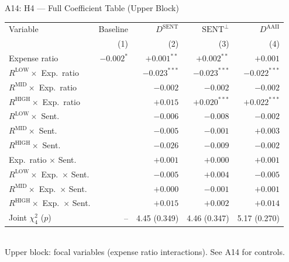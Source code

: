 \documentclass[10pt, aspectratio=169]{beamer}
\begin{document}
\begin{frame}{A14: H4 — Full Coefficient Table (Upper Block)}
  \scriptsize
  \setlength{\tabcolsep}{4pt}
  \begin{tabular}{@{}lrrrr@{}}
    \toprule
    Variable & Baseline & $D^{\text{SENT}}$ & $\text{SENT}^\perp$ & $D^{\text{AAII}}$ \\
    & (1) & (2) & (3) & (4) \\
    \midrule
    Expense ratio                          & $-0.002^{*}$  & $+0.001^{**}$ & $+0.002^{**}$ & $+0.001$ \\
    $R^{\text{LOW}}\times$ Exp.\ ratio     &               & $-0.023^{***}$& $-0.023^{***}$& $-0.022^{***}$ \\
    $R^{\text{MID}}\times$ Exp.\ ratio     &               & $-0.002$      & $-0.002$      & $-0.002$ \\
    $R^{\text{HIGH}}\times$ Exp.\ ratio    &               & $+0.015$      & $+0.020^{***}$& $+0.022^{***}$ \\
    $R^{\text{LOW}}\times$ Sent.           &               & $-0.006$      & $-0.008$      & $-0.002$ \\
    $R^{\text{MID}}\times$ Sent.           &               & $-0.005$      & $-0.001$      & $+0.003$ \\
    $R^{\text{HIGH}}\times$ Sent.          &               & $-0.026$      & $-0.009$      & $-0.002$ \\
    Exp.\ ratio $\times$ Sent.             &               & $+0.001$      & $+0.000$      & $+0.001$ \\
    $R^{\text{LOW}}\times$ Exp.\ $\times$ Sent. &          & $-0.005$      & $+0.004$      & $-0.005$ \\
    $R^{\text{MID}}\times$ Exp.\ $\times$ Sent. &          & $+0.000$      & $-0.001$      & $+0.001$ \\
    $R^{\text{HIGH}}\times$ Exp.\ $\times$ Sent.&          & $+0.015$      & $+0.002$      & $+0.014$ \\
    \midrule
    Joint $\chi^2_4$ ($p$)                 & --            & 4.45 (0.349)  & 4.46 (0.347)  & 5.17 (0.270) \\
    \bottomrule
  \end{tabular}
  \vspace{3pt}\\
  \tiny Upper block: focal variables (expense ratio interactions). See A14 for controls.
\end{frame}
\end{document}
